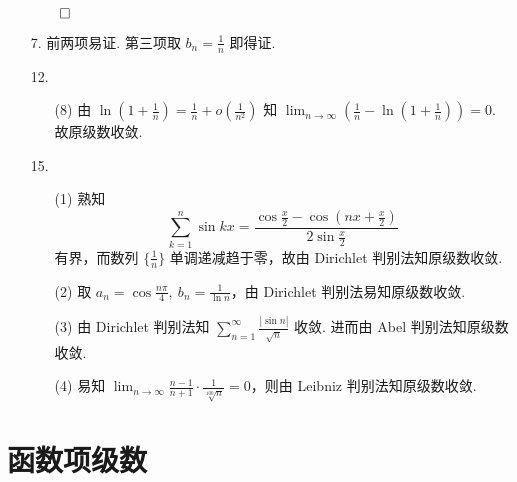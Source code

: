 \documentclass[11pt,oneside,fontset=fandol]{ctexbook} %
\begin{document}
\begin{enumerate}
    $\hfill\qed$
    \item[7.]
    前两项易证. 第三项取 $b_n = \frac 1 n$ 即得证.
    \item[12.]
    \begin{enumerate}
        \item[(8)]
        由 $\ln\left( 1 + \frac 1 n \right) = \frac 1 n + o \left( \frac 1 {n^2} \right)$ 知 $\lim_{n \to \infty} \left( \frac 1 n - \ln \left( 1 + \frac 1 n \right) \right) = 0$. 故原级数收敛.
    \end{enumerate}
    \item[15.]
    \begin{enumerate}
        \item[(1)]
        熟知
        \[
            \sum_{k=1}^n \sin kx = \frac{\cos \frac x 2 - \cos \left( nx + \frac x 2 \right)}{2 \sin \frac x 2}
        \]
        有界，而数列 $\{ \frac 1 n \}$ 单调递减趋于零，故由 Dirichlet 判别法知原级数收敛.
        \item[(2)]
        取 $a_n = \cos \frac {n \pi} 4,\ b_n = \frac 1 {\ln n}$，由 Dirichlet 判别法易知原级数收敛.
        \item[(3)]
        由 Dirichlet 判别法知 $\sum_{n=1}^{\infty} \frac{|\sin n|}{\sqrt n}$ 收敛. 进而由 Abel 判别法知原级数收敛.
        \item[(4)]
        易知 $\lim_{n \to \infty} \frac{n-1}{n+1} \cdot \frac 1 {\sqrt[100] n} = 0$，则由 Leibniz 判别法知原级数收敛.
    \end{enumerate}
\end{enumerate}

\section{函数项级数}
\end{document}
